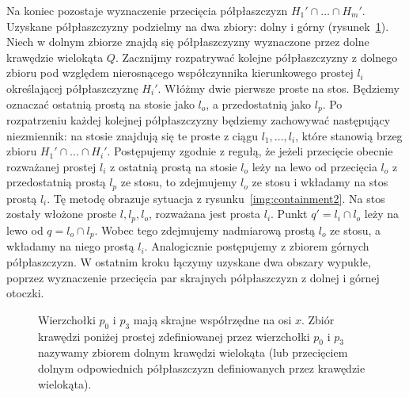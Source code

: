 Na koniec pozostaje wyznaczenie przecięcia półpłaszczyzn $H_1' \cap
\ldots \cap H_m'$. Uzyskane półpłaszczyzny podzielmy na dwa zbiory:
dolny i górny (rysunek~\ref{fig:lowerpart}). Niech w dolnym zbiorze
znajdą się półpłaszczyzny wyznaczone przez dolne krawędzie wielokąta
$Q$. Zacznijmy rozpatrywać kolejne półpłaszczyzny z dolnego zbioru pod
względem nierosnącego współczynnika kierunkowego prostej $l_i$
określającej półpłaszczyznę $H_i'$. Włóżmy dwie pierwsze proste na
stos. Będziemy oznaczać ostatnią prostą na stosie jako $l_o$, a
przedostatnią jako $l_p$. Po rozpatrzeniu każdej kolejnej
półpłaszczyzny będziemy zachowywać następujący niezmiennik: na stosie
znajdują się te proste z ciągu $l_1, \ldots, l_i$, które stanowią
brzeg zbioru $H_1' \cap \ldots \cap H_i'$. Postępujemy zgodnie z
regułą, że jeżeli przecięcie obecnie rozważanej prostej $l_i$ z
ostatnią prostą na stosie $l_o$ leży na lewo od przecięcia $l_o$ z
przedostatnią prostą $l_p$ ze stosu, to zdejmujemy $l_o$ ze stosu i
wkładamy na stos prostą $l_i$. Tę metodę obrazuje sytuacja z
rysunku~\ref{img:containment2}. Na stos zostały włożone proste $l,
l_p, l_o$, rozważana jest prosta $l_i$. Punkt $q' = l_i \cap l_o$ leży
na lewo od $q = l_o \cap l_p$. Wobec tego zdejmujemy nadmiarową prostą
$l_o$ ze stosu, a wkładamy na niego prostą $l_i$. Analogicznie
postępujemy z zbiorem górnych półpłaszczyzn. W ostatnim kroku łączymy
uzyskane dwa obszary wypukłe, poprzez wyznaczenie przecięcia par
skrajnych półpłaszczyzn z dolnej i górnej otoczki.

\begin{figure}
  \centering
  \caption{\label{fig:lowerpart} Wierzchołki $p_0$ i $p_3$ mają
    skrajne współrzędne na osi $x$. Zbiór krawędzi poniżej prostej
    zdefiniowanej przez wierzchołki $p_0$ i $p_3$ nazywamy zbiorem
    dolnym krawędzi wielokąta (lub przecięciem dolnym odpowiednich
    półpłaszczyzn definiowanych przez krawędzie wielokąta).}
\end{figure}

